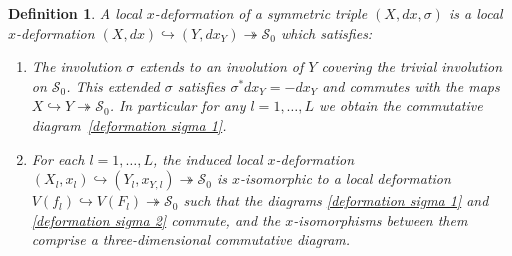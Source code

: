 \documentclass[11pt,twoside]{amsart}
\theoremstyle{plain}
\newtheorem{definition}[theorem]{Definition}
\newcommand{\Sm}{\mathcal{S}}
\newcommand{\dfx}{dx}
\begin{document}
\begin{definition}\label{def:deformation sigma}
A local $x$-deformation of a symmetric triple $(X,\dfx,\sigma)$ is a local $x$-deformation $(X,\dfx)\hookrightarrow(Y,\dfx_Y)\twoheadrightarrow\Sm_0$ which satisfies:
\begin{enumerate}
\item[(i)] The involution $\sigma$ extends to an involution of $Y$ covering the trivial involution on $\Sm_0$. This extended $\sigma$ satisfies $\sigma^\ast\dfx_Y=-\dfx_Y$ and commutes with the maps $X\hookrightarrow Y\twoheadrightarrow\Sm_0$. In particular for any $l=1,\ldots,L$ we obtain the commutative diagram~\eqref{deformation sigma 1}.
\item[(ii)] For each $l=1,\ldots,L$, the induced local $x$-deformation $(X_l, x_l) \hookrightarrow (Y_l, x_{Y,l}) \twoheadrightarrow \mathcal{S}_0$ is $x$-isomorphic to a local deformation $V(f_l)\hookrightarrow V(F_l)\twoheadrightarrow\Sm_0$ such that the diagrams \eqref{deformation sigma 1} and \eqref{deformation sigma 2} commute, and the $x$-isomorphisms between them comprise a three-dimensional commutative diagram.
\end {enumerate}
\end {definition}

\end{document}
